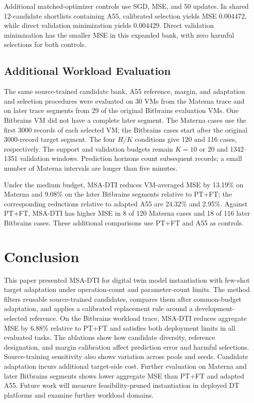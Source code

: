 \documentclass[a4paper,fleqn]{cas-sc}
\begin{document}
Additional matched-optimizer controls use SGD, MSE, and 50 updates. In
shared 12-candidate shortlists containing A55, calibrated selection yields MSE 0.004472,
while direct validation minimization yields 0.004429. Direct validation
minimization has the smaller MSE in this expanded bank, with zero harmful
selections for both controls.

\subsection{Additional Workload Evaluation}
The same source-trained candidate bank, A55 reference, margin, and adaptation
and selection procedures were evaluated on 30 VMs from the Materna trace
\cite{refMaterna,refKohne2014,refKohne2016} and on later trace segments from
29 of the original Bitbrains evaluation VMs. One Bitbrains VM did not have a
complete later segment. The Materna cases use the first 3000 records of each
selected VM; the Bitbrains cases start after the original 3000-record target
segment. The four $H/K$ conditions give 120 and 116 cases, respectively.
The support and validation budgets remain $K=10$ or $20$ and 1342--1351
validation windows. Prediction horizons count subsequent records; a small
number of Materna intervals are longer than five minutes.

Under the medium budget, MSA-DTI reduces VM-averaged MSE by 13.19\% on Materna
and 9.08\% on the later Bitbrains segments relative to PT+FT; the corresponding
reductions relative to adapted A55 are 24.32\% and 2.95\%. Against PT+FT,
MSA-DTI has higher MSE in 8 of 120 Materna cases and 18 of 116 later Bitbrains
cases. These additional comparisons use PT+FT and A55 as controls.

\section{Conclusion}
\label{sec:conclusion}
This paper presented MSA-DTI for digital twin model instantiation with
few-shot target adaptation under operation-count and parameter-count limits.
The method filters reusable source-trained candidates, compares them after
common-budget adaptation, and applies a calibrated replacement rule around
a development-selected reference. On the Bitbrains workload trace,
MSA-DTI reduces aggregate MSE by 6.88\% relative to PT+FT and satisfies
both deployment limits in all evaluated tasks. The ablations show how
candidate diversity, reference designation, and margin calibration affect
prediction error and harmful selections. Source-training sensitivity also
shows variation across pools and seeds. Candidate adaptation incurs
additional target-side cost. Further evaluation on Materna and later
Bitbrains segments shows lower aggregate MSE than PT+FT and adapted A55.
Future work will measure feasibility-pruned instantiation in deployed DT
platforms and examine further workload domains.
\end{document}
